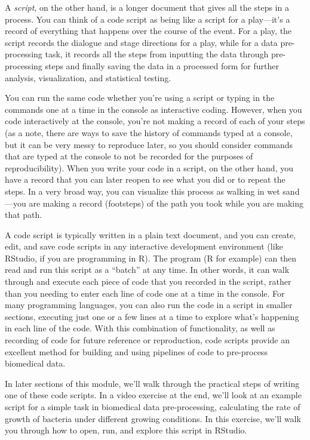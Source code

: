 \documentclass[]{tufte-book}
\begin{document}
A \emph{script}, on the other hand, is a longer document that gives all the steps in a
process. You can think of a code script as being like a script for a play---it's
a record of everything that happens over the course of the event. For a play,
the script records the dialogue and stage directions for a play, while for a
data pre-processing task, it records all the steps from inputting the data
through pre-processing steps and finally saving the data in a processed form for
further analysis, visualization, and statistical testing.

You can run the same code whether you're using a script or typing in the
commands one at a time in the console as interactive coding. However, when you
code interactively at the console, you're not making a record of each of your
steps (as a note, there are ways to save the history of commands typed at a
console, but it can be very messy to reproduce later, so you should consider
commands that are typed at the console to not be recorded for the purposes of
reproducibility). When you write your code in a script, on the other hand, you
have a record that you can later reopen to see what you did or to repeat the
steps. In a very broad way, you can visualize this process as walking in wet
sand---you are making a record (footsteps) of the path you took while you are
making that path.

A code script is typically written in a plain text document, and you can create,
edit, and save code scripts in any interactive development environment (like
RStudio, if you are programming in R). The program (R for example) can then read
and run this script as a ``batch'' at any time. In other words, it can walk
through and execute each piece of code that you recorded in the script, rather
than you needing to enter each line of code one at a time in the console. For
many programming languages, you can also run the code in a script in smaller
sections, executing just one or a few lines at a time to explore what's
happening in each line of the code. With this combination of functionality, as
well as recording of code for future reference or reproduction, code scripts
provide an excellent method for building and using pipelines of code to
pre-process biomedical data.

In later sections of this module, we'll walk through the practical steps of
writing one of these code scripts. In a video exercise at the end, we'll look at
an example script for a simple task in biomedical data pre-processing,
calculating the rate of growth of bacteria under different growing conditions.
In this exercise, we'll walk you through how to open, run, and explore this
script in RStudio.
\end{document}
